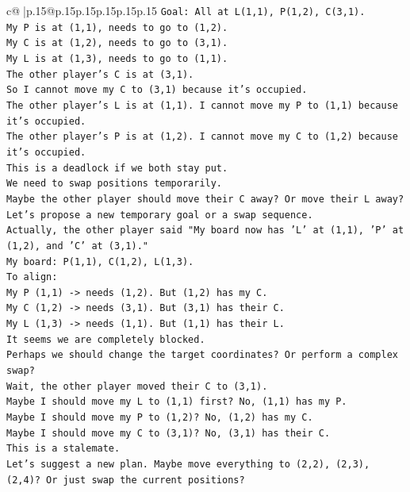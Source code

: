 \documentclass{article}
\begin{document}
{\begin{supertabular}{c@{$\;$}|p{.15\linewidth}@{}p{.15\linewidth}p{.15\linewidth}p{.15\linewidth}p{.15\linewidth}p{.15\linewidth}}
{{{\texttt{Goal: All at L(1,1), P(1,2), C(3,1).} \\
\texttt{My P is at (1,1), needs to go to (1,2).} \\
\texttt{My C is at (1,2), needs to go to (3,1).} \\
\texttt{My L is at (1,3), needs to go to (1,1).} \\
\texttt{The other player's C is at (3,1).} \\
\texttt{So I cannot move my C to (3,1) because it's occupied.} \\
\texttt{The other player's L is at (1,1). I cannot move my P to (1,1) because it's occupied.} \\
\texttt{The other player's P is at (1,2). I cannot move my C to (1,2) because it's occupied.} \\
\texttt{This is a deadlock if we both stay put.} \\
\texttt{We need to swap positions temporarily.} \\
\texttt{Maybe the other player should move their C away? Or move their L away?} \\
\texttt{Let's propose a new temporary goal or a swap sequence.} \\
\texttt{Actually, the other player said "My board now has 'L' at (1,1), 'P' at (1,2), and 'C' at (3,1)."} \\
\texttt{My board: P(1,1), C(1,2), L(1,3).} \\
\texttt{To align:} \\
\texttt{My P (1,1) {-}> needs (1,2). But (1,2) has my C.} \\
\texttt{My C (1,2) {-}> needs (3,1). But (3,1) has their C.} \\
\texttt{My L (1,3) {-}> needs (1,1). But (1,1) has their L.} \\
\texttt{It seems we are completely blocked.} \\
\texttt{Perhaps we should change the target coordinates? Or perform a complex swap?} \\
\texttt{Wait, the other player moved their C to (3,1).} \\
\texttt{Maybe I should move my L to (1,1) first? No, (1,1) has my P.} \\
\texttt{Maybe I should move my P to (1,2)? No, (1,2) has my C.} \\
\texttt{Maybe I should move my C to (3,1)? No, (3,1) has their C.} \\
\texttt{This is a stalemate.} \\
\texttt{Let's suggest a new plan. Maybe move everything to (2,2), (2,3), (2,4)? Or just swap the current positions?} \\
}}}
\end{supertabular}}
\end{document}
